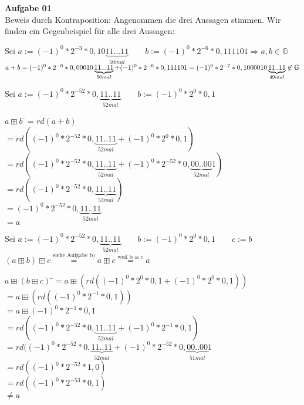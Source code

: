 \documentclass[a4paper,10pt]{article}
\begin{document}
	\parindent0pt
	\textbf{Aufgabe 01}\\
	
	Beweis durch Kontraposition: Angenommen die drei Aussagen stimmen. Wir finden ein Gegenbeispiel für alle drei Aussagen:\\
	
	\begin{compactenum} [a)]
		\item Sei $ a := (-1)^0*2^{-3}*0,10\underbrace{11...11}_{50 mal} \qquad b := (-1)^0*2^{-6}*0,111101 \Longrightarrow a, b \in \mathbb{G}$\\
		$ a+b = (-1)^0*2^{-6}*0,00010\underbrace{11...11}_{50 mal} + (-1)^0*2^{-6}*0,111101 \\
		= (-1)^0*2^{-7}*0,1000010\underbrace{11..11}_{49 mal} \not\in \mathbb{G}$
		\item  Sei $ a:= (-1)^0*2^{-52}*0,\underbrace{11..11}_{52 mal} \qquad b:= (-1)^0*2^0*0,1$\\
		\begin{tabbing}
			$ a\boxplus b$ \=$= rd(a+b)$ \\
			\>$ =rd((-1)^0*2^{-52}*0,\underbrace{11..11}_{52 mal}+(-1)^0*2^0*0,1) $ \\
			\>$ =rd((-1)^0*2^{-52}*0,\underbrace{11..11}_{52 mal}+(-1)^0*2^{-52}*0,\underbrace{00..00}_{52 mal}1) $ \\
			\>$ =rd((-1)^0*2^{-52}*0,\underbrace{11..11}_{53 mal})$\\
			\>$ =(-1)^0*2^{-52}*0,\underbrace{11..11}_{52 mal}$\\
			\>$ =a $
		\end{tabbing}
		\item Sei $ a:= (-1)^0*2^{-52}*0,\underbrace{11..11}_{52 mal} \qquad b:= (-1)^0*2^0*0,1 \qquad c:= b $\\
		$ (a\boxplus b) \boxplus c \overset{\text{siehe Aufgabe b)}}{=} a \boxplus c \overset{\text{weil b $\equiv$ c}}{=} a$\\
		\begin{tabbing}
			$ a\boxplus (b\boxplus c) $ \=$ = a \boxplus (rd((-1)^0*2^0*0,1+(-1)^0*2^0*0,1))$\\
			\> $ =a \boxplus (rd((-1)^0*2^{-1}*0,1)) $\\
			\> $ =a \boxplus (-1)^0*2^{-1}*0,1 $\\
			\> $ =rd((-1)^0*2^{-52}*0,\underbrace{11..11}_{52 mal}+(-1)^0*2^{-1}*0,1) $\\
			\> $ =rd((-1)^0*2^{-52}*0,\underbrace{11..11}_{52 mal}+(-1)^0*2^{-52}*0,\underbrace{00..00}_{51 mal}1 $\\
			\> $ =rd((-1)^0*2^{-52}*1,0) $ \\
			\> $ =rd((-1)^0*2^{-53}*0,1) $\\
			\> $ \neq a $
		\end{tabbing}
	\end{compactenum}
	
\end{document}
